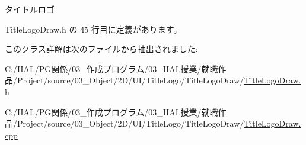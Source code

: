 タイトルロゴ 



 Title\+Logo\+Draw.\+h の 45 行目に定義があります。



このクラス詳解は次のファイルから抽出されました\+:\begin{DoxyCompactItemize}
\item 
C\+:/\+H\+A\+L/\+P\+G関係/03\+\_\+作成プログラム/03\+\_\+\+H\+A\+L授業/就職作品/\+Project/source/03\+\_\+\+Object/2\+D/\+U\+I/\+Title\+Logo/\+Title\+Logo\+Draw/\mbox{\hyperlink{_title_logo_draw_8h}{Title\+Logo\+Draw.\+h}}\item 
C\+:/\+H\+A\+L/\+P\+G関係/03\+\_\+作成プログラム/03\+\_\+\+H\+A\+L授業/就職作品/\+Project/source/03\+\_\+\+Object/2\+D/\+U\+I/\+Title\+Logo/\+Title\+Logo\+Draw/\mbox{\hyperlink{_title_logo_draw_8cpp}{Title\+Logo\+Draw.\+cpp}}\end{DoxyCompactItemize}
